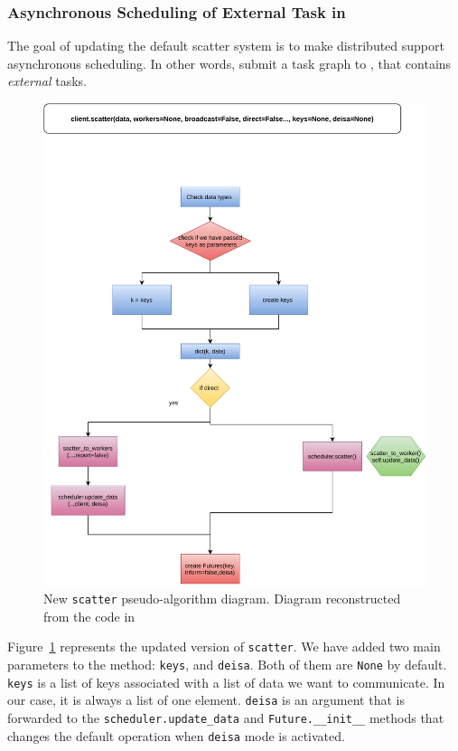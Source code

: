 \subsubsection{Asynchronous Scheduling of External Task in \dask}\label{sec:asynchscheduling}

The goal of updating the default scatter system is to make \dask distributed support asynchronous scheduling. In other words, submit a task graph to \dask, that contains \textit{external} tasks. 

\begin{figure}[h!]\centering
\includegraphics[scale=0.5]{figures/Dask-scatter().pdf}
\caption{New \texttt{scatter} pseudo-algorithm diagram. Diagram reconstructed from the code in~\cite{amal_distributed_2022}}
\label{figscatter}
\end{figure}

Figure~\ref{figscatter} represents the updated version of \texttt{scatter}. We have added two main parameters to the method: \texttt{keys}, and \texttt{deisa}. Both of them are \texttt{None} by default. \texttt{keys} is a list of keys associated with a list of data we want to communicate. In our case, it is always a list of one element. \texttt{deisa} is an argument that is forwarded to the \texttt{scheduler.update\_data} and \texttt{Future.\_\_init\_\_}  methods  that changes the default operation when \texttt{deisa} mode is activated.

